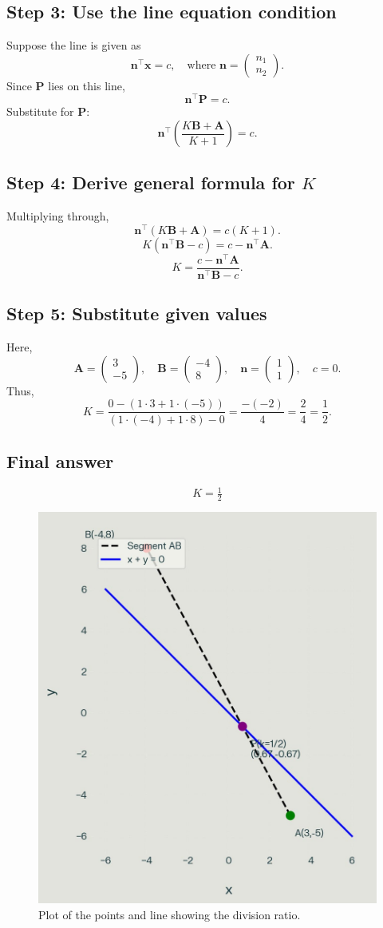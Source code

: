 \documentclass[journal]{IEEEtran}
\begin{document}
\subsection*{\textbf{Step 3: Use the line equation condition}}
Suppose the line is given as
\[
\mathbf{n}^\top \mathbf{x} = c, \quad \text{where } \mathbf{n} = \begin{pmatrix} n_1 \\ n_2 \end{pmatrix}.
\]
Since \(\mathbf{P}\) lies on this line,
\[
\mathbf{n}^\top \mathbf{P} = c.
\]
Substitute for \(\mathbf{P}\):
\[
\mathbf{n}^\top \left(\frac{K\mathbf{B} + \mathbf{A}}{K+1}\right) = c.
\]

\subsection*{\textbf{Step 4: Derive general formula for \(K\)}}
Multiplying through,
\[
\mathbf{n}^\top (K\mathbf{B} + \mathbf{A}) = c(K+1).
\]
\[
K(\mathbf{n}^\top \mathbf{B} - c) = c - \mathbf{n}^\top \mathbf{A}.
\]
\[
K = \frac{c - \mathbf{n}^\top \mathbf{A}}{\mathbf{n}^\top \mathbf{B} - c}.
\]

\subsection*{\textbf{Step 5: Substitute given values}}
Here,
\[
\mathbf{A} = \begin{pmatrix} 3 \\ -5 \end{pmatrix}, \quad 
\mathbf{B} = \begin{pmatrix} -4 \\ 8 \end{pmatrix}, \quad 
\mathbf{n} = \begin{pmatrix} 1 \\ 1 \end{pmatrix}, \quad 
c = 0.
\]
Thus,
\[
K = \frac{0 - (1\cdot 3 + 1\cdot (-5))}{(1\cdot (-4) + 1\cdot 8) - 0}
= \frac{-(-2)}{4}
= \frac{2}{4}
= \frac{1}{2}.
\]

\subsection*{\textbf{Final answer}}
\[
\boxed{K = \tfrac{1}{2}}
\]

\begin{figure}[htbp]
\centering
\includegraphics[width=0.7\columnwidth]{figs/python_plot.png} 
\caption{Plot of the points and line showing the division ratio.}
\label{fig:1}
\end{figure}
\end{document}
